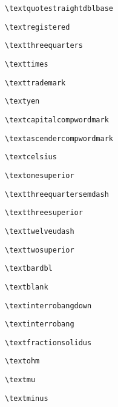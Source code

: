 \documentclass{scrartcl}
\begin{document}
\wrapglyph{\textquotestraightdblbase} \verb+\textquotestraightdblbase+\par
\wrapglyph{\textregistered} \verb+\textregistered+\par
\wrapglyph{\textthreequarters} \verb+\textthreequarters+\par
\wrapglyph{\texttimes} \verb+\texttimes+\par
\wrapglyph{\texttrademark} \verb+\texttrademark+\par
\wrapglyph{\textyen} \verb+\textyen+\par
\wrapglyph{\textcapitalcompwordmark} \verb+\textcapitalcompwordmark+\par
\wrapglyph{\textascendercompwordmark} \verb+\textascendercompwordmark+\par

\clearpage
{}

\wrapglyph{\textcelsius} \verb+\textcelsius+\par
\wrapglyph{\textonesuperior} \verb+\textonesuperior+\par
\wrapglyph{\textthreequartersemdash} \verb+\textthreequartersemdash+\par
\wrapglyph{\textthreesuperior} \verb+\textthreesuperior+\par
\wrapglyph{\texttwelveudash} \verb+\texttwelveudash+\par
\wrapglyph{\texttwosuperior} \verb+\texttwosuperior+\par
\wrapglyph{\textbardbl} \verb+\textbardbl+\par

\clearpage
{}

\wrapglyph{\textblank} \verb+\textblank+\par
\wrapglyph{\textinterrobangdown} \verb+\textinterrobangdown+\par
\wrapglyph{\textinterrobang} \verb+\textinterrobang+\par

\clearpage
{}

\wrapglyph{\textfractionsolidus} \verb+\textfractionsolidus+\par
\wrapglyph{\textohm} \verb+\textohm+\par
\wrapglyph{\textmu} \verb+\textmu+\par
\wrapglyph{\textminus} \verb+\textminus+\par
\end{document}

